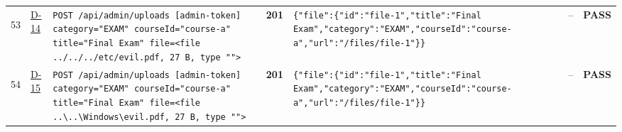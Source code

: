\documentclass[10pt,a4paper]{article}
\begin{document}
\begin{landscape}
\begin{longtable}{@{}P{0.6cm}P{0.9cm}P{8.5cm}P{1.0cm}P{6.2cm}P{4.2cm}P{1.1cm}@{}}
\hypertarget{call53}{53} & \hyperlink{test-D-14}{D-14} & \texttt{POST /\allowbreak{}api/\allowbreak{}admin/\allowbreak{}uploads [admin-\allowbreak{}token] category=\allowbreak{}"\allowbreak{}EXAM"\allowbreak{} courseId=\allowbreak{}"\allowbreak{}course-\allowbreak{}a"\allowbreak{} title=\allowbreak{}"\allowbreak{}Final Exam"\allowbreak{} file=\allowbreak{}<file .\allowbreak{}.\allowbreak{}/\allowbreak{}.\allowbreak{}.\allowbreak{}/\allowbreak{}.\allowbreak{}.\allowbreak{}/\allowbreak{}etc/\allowbreak{}evil.\allowbreak{}pdf,\allowbreak{} 27 B,\allowbreak{} type "\allowbreak{}"\allowbreak{}>} & \textcolor{passgreen}{\textbf{201}} & \texttt{\{"\allowbreak{}file"\allowbreak{}:\allowbreak{}\{"\allowbreak{}id"\allowbreak{}:\allowbreak{}"\allowbreak{}file-\allowbreak{}1"\allowbreak{},\allowbreak{}"\allowbreak{}title"\allowbreak{}:\allowbreak{}"\allowbreak{}Final Exam"\allowbreak{},\allowbreak{}"\allowbreak{}category"\allowbreak{}:\allowbreak{}"\allowbreak{}EXAM"\allowbreak{},\allowbreak{}"\allowbreak{}courseId"\allowbreak{}:\allowbreak{}"\allowbreak{}course-\allowbreak{}a"\allowbreak{},\allowbreak{}"\allowbreak{}url"\allowbreak{}:\allowbreak{}"\allowbreak{}/\allowbreak{}files/\allowbreak{}file-\allowbreak{}1"\allowbreak{}\}\}} & -- & \textcolor{passgreen}{\textbf{PASS}} \\
\hypertarget{call54}{54} & \hyperlink{test-D-15}{D-15} & \texttt{POST /\allowbreak{}api/\allowbreak{}admin/\allowbreak{}uploads [admin-\allowbreak{}token] category=\allowbreak{}"\allowbreak{}EXAM"\allowbreak{} courseId=\allowbreak{}"\allowbreak{}course-\allowbreak{}a"\allowbreak{} title=\allowbreak{}"\allowbreak{}Final Exam"\allowbreak{} file=\allowbreak{}<file .\allowbreak{}.\allowbreak{}\textbackslash{}\allowbreak{}.\allowbreak{}.\allowbreak{}\textbackslash{}\allowbreak{}Windows\textbackslash{}\allowbreak{}evil.\allowbreak{}pdf,\allowbreak{} 27 B,\allowbreak{} type "\allowbreak{}"\allowbreak{}>} & \textcolor{passgreen}{\textbf{201}} & \texttt{\{"\allowbreak{}file"\allowbreak{}:\allowbreak{}\{"\allowbreak{}id"\allowbreak{}:\allowbreak{}"\allowbreak{}file-\allowbreak{}1"\allowbreak{},\allowbreak{}"\allowbreak{}title"\allowbreak{}:\allowbreak{}"\allowbreak{}Final Exam"\allowbreak{},\allowbreak{}"\allowbreak{}category"\allowbreak{}:\allowbreak{}"\allowbreak{}EXAM"\allowbreak{},\allowbreak{}"\allowbreak{}courseId"\allowbreak{}:\allowbreak{}"\allowbreak{}course-\allowbreak{}a"\allowbreak{},\allowbreak{}"\allowbreak{}url"\allowbreak{}:\allowbreak{}"\allowbreak{}/\allowbreak{}files/\allowbreak{}file-\allowbreak{}1"\allowbreak{}\}\}} & -- & \textcolor{passgreen}{\textbf{PASS}} \\

\end{longtable}
\end{landscape}
\end{document}

